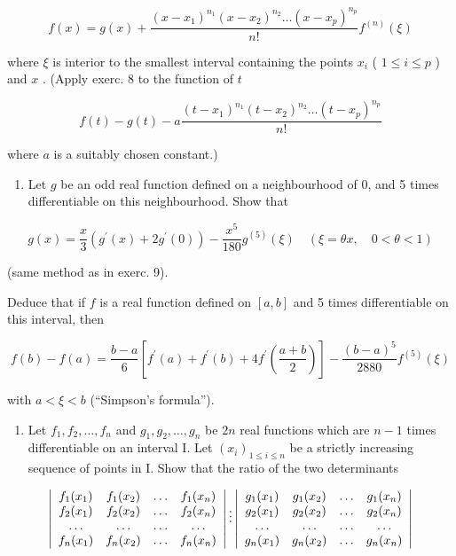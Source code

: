 \[
f (x) = g (x) + \frac {(x - x _ {1}) ^ {n _ {1}} (x - x _ {2}) ^ {n _ {2}} \dots (x - x _ {p}) ^ {n _ {p}}}{n !} f ^ {(n)} (\xi)
\]

where \(\xi\) is interior to the smallest interval containing the points \(x_{i}\) ( \(1 \leqslant i \leqslant p\) ) and \(x\) . (Apply exerc. 8 to the function of \(t\)

\[
f (t) - g (t) - a \frac {(t - x _ {1}) ^ {n _ {1}} (t - x _ {2}) ^ {n _ {2}} \dots (t - x _ {p}) ^ {n _ {p}}}{n !}
\]

where \(a\) is a suitably chosen constant.)

\begin{enumerate}
\def\labelenumi{\arabic{enumi})}
\setcounter{enumi}{9}
\tightlist
\item
  Let \(g\) be an odd real function defined on a neighbourhood of 0, and 5 times differentiable on this neighbourhood. Show that
\end{enumerate}

\[
g (x) = \frac {x}{3} \left(g ^ {\prime} (x) + 2 g ^ {\prime} (0)\right) - \frac {x ^ {5}}{1 8 0} g ^ {(5)} (\xi) \quad (\xi = \theta x, \quad 0 <   \theta <   1)
\]

(same method as in exerc. 9).

Deduce that if \(f\) is a real function defined on \([a, b]\) and 5 times differentiable on this interval, then

\[
f (b) - f (a) = \frac {b - a}{6} \left[ f ^ {\prime} (a) + f ^ {\prime} (b) + 4 f ^ {\prime} \left(\frac {a + b}{2}\right) \right] - \frac {(b - a) ^ {5}}{2 8 8 0} f ^ {(5)} (\xi)
\]

with \(a < \xi < b\) (``Simpson's formula'').

\begin{enumerate}
\def\labelenumi{\arabic{enumi})}
\setcounter{enumi}{10}
\tightlist
\item
  Let \(f_{1}, f_{2}, \ldots, f_{n}\) and \(g_{1}, g_{2}, \ldots, g_{n}\) be \(2n\) real functions which are \(n - 1\) times differentiable on an interval I. Let \((x_{i})_{1 \leqslant i \leqslant n}\) be a strictly increasing sequence of points in I. Show that the ratio of the two determinants
\end{enumerate}

\[
\left| \begin{array}{c c c c} f _ {1} (x _ {1}) & f _ {1} (x _ {2}) & \dots & f _ {1} (x _ {n}) \\ f _ {2} (x _ {1}) & f _ {2} (x _ {2}) & \dots & f _ {2} (x _ {n}) \\ \dots & \dots & \dots & \dots \\ f _ {n} (x _ {1}) & f _ {n} (x _ {2}) & \dots & f _ {n} (x _ {n}) \end{array} \right| \vdots \left| \begin{array}{c c c c} g _ {1} (x _ {1}) & g _ {1} (x _ {2}) & \dots & g _ {1} (x _ {n}) \\ g _ {2} (x _ {1}) & g _ {2} (x _ {2}) & \dots & g _ {2} (x _ {n}) \\ \dots & \dots & \dots & \dots \\ g _ {n} (x _ {1}) & g _ {n} (x _ {2}) & \dots & g _ {n} (x _ {n}) \end{array} \right|
\]

